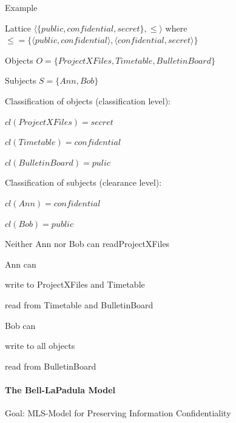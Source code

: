 \documentclass[a4paper]{article}
\begin{document}
\begin{multicols}{3}
    Example
    \begin{itemize*}
        \item Lattice $⟨\{public,confidential,secret\},\leq⟩$ where $\leq=\{⟨public,confidential⟩,⟨confidential,secret⟩\}$
        \item Objects $O=\{ProjectXFiles, Timetable, BulletinBoard\}$
        \item Subjects $S=\{Ann, Bob\}$
        \item Classification of objects (classification level):
        \begin{itemize*}
            \item $cl(ProjectXFiles)=secret$
            \item $cl(Timetable)=confidential$
            \item $cl(BulletinBoard)=pulic$
        \end{itemize*}
        \item Classification of subjects (clearance level):
        \begin{itemize*}
            \item $cl(Ann)=confidential$
            \item $cl(Bob)=public$
        \end{itemize*}
        \item Neither Ann nor Bob can readProjectXFiles
        \item Ann can
        \begin{itemize*}
            \item write to ProjectXFiles and Timetable
            \item read from Timetable and BulletinBoard
        \end{itemize*}
        \item Bob can
        \begin{itemize*}
            \item write to all objects
            \item read from BulletinBoard
        \end{itemize*}
    \end{itemize*}


    \paragraph{The Bell-LaPadula Model}
    Goal: MLS-Model for Preserving Information Confidentiality


\end{multicols}
\end{document}
